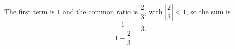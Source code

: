 The first term is $1$ and the common ratio is $\dfrac23$, with $\left|\dfrac23\right|<1$, so the sum is
\[\dfrac{1}{1-\dfrac23}=\boxed{3}.\]

